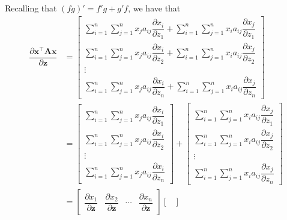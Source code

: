 \documentclass{article}
\newcommand{\trans}{\top}
\begin{document}
Recalling that \((fg)' = f'g + g'f\), we have that
\begin{align}
    \dfrac{\partial \mathbf{x}^\trans \mathbf{A} \mathbf{x}}{\partial \mathbf{z}} &= \begin{bmatrix}
        \displaystyle \sum_{i = 1}^{n}\sum_{j = 1}^{n} x_{j}a_{ij} \dfrac{\partial x_{i}}{\partial z_1} +
        \sum_{i = 1}^{n}\sum_{j = 1}^{n} x_{i}a_{ij} \dfrac{\partial x_{j}}{\partial z_1} \\ 
        \displaystyle \sum_{i = 1}^{n}\sum_{j = 1}^{n} x_{j}a_{ij} \dfrac{\partial x_{i}}{\partial z_2} +
        \sum_{i = 1}^{n}\sum_{j = 1}^{n} x_{i}a_{ij} \dfrac{\partial x_{j}}{\partial z_2} \\ 
        \vdots \\ 
        \displaystyle \sum_{i = 1}^{n}\sum_{j = 1}^{n} x_{j}a_{ij} \dfrac{\partial x_{i}}{\partial z_n} +
        \sum_{i = 1}^{n}\sum_{j = 1}^{n} x_{i}a_{ij} \dfrac{\partial x_{j}}{\partial z_n} 
    \end{bmatrix} \\
    &= \begin{bmatrix}
        \displaystyle \sum_{i = 1}^{n}\sum_{j = 1}^{n} x_{j}a_{ij} \dfrac{\partial x_{i}}{\partial z_1} \\
        \displaystyle \sum_{i = 1}^{n}\sum_{j = 1}^{n} x_{j}a_{ij} \dfrac{\partial x_{i}}{\partial z_2} \\
        \vdots \\ 
        \displaystyle \sum_{i = 1}^{n}\sum_{j = 1}^{n} x_{j}a_{ij} \dfrac{\partial x_{i}}{\partial z_n}
    \end{bmatrix} +
    \begin{bmatrix}
        \displaystyle \sum_{i = 1}^{n}\sum_{j = 1}^{n} x_{i}a_{ij} \dfrac{\partial x_{j}}{\partial z_1} \\ 
        \displaystyle \sum_{i = 1}^{n}\sum_{j = 1}^{n} x_{i}a_{ij} \dfrac{\partial x_{j}}{\partial z_2} \\ 
        \vdots \\ 
        \displaystyle \sum_{i = 1}^{n}\sum_{j = 1}^{n} x_{i}a_{ij} \dfrac{\partial x_{j}}{\partial z_n} 
    \end{bmatrix} \\
    &= \begin{bmatrix}
       \dfrac{\partial x_{1}}{\partial \mathbf{z}} & \dfrac{\partial x_{2}}{\partial \mathbf{z}} & \cdots  & \dfrac{\partial x_{n}}{\partial \mathbf{z}}
    \end{bmatrix}
    \begin{bmatrix}

\end{bmatrix}
\end{align}
\end{document}
